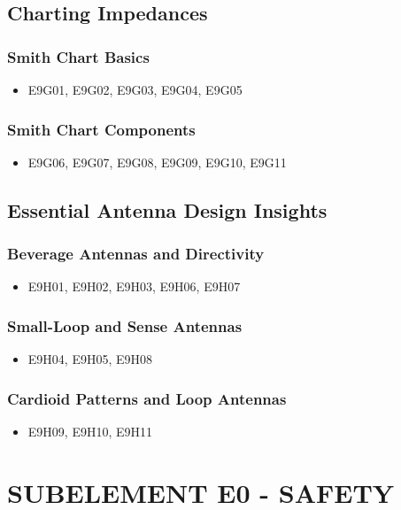 \documentclass{book}
\begin{document}
\section{Charting Impedances}
\subsection{Smith Chart Basics}
\begin{itemize}
    \item E9G01, E9G02, E9G03, E9G04, E9G05
\end{itemize}
\subsection{Smith Chart Components}
\begin{itemize}
    \item E9G06, E9G07, E9G08, E9G09, E9G10, E9G11
\end{itemize}

\section{Essential Antenna Design Insights}
\subsection{Beverage Antennas and Directivity}
\begin{itemize}
    \item E9H01, E9H02, E9H03, E9H06, E9H07
\end{itemize}
\subsection{Small-Loop and Sense Antennas}
\begin{itemize}
    \item E9H04, E9H05, E9H08
\end{itemize}
\subsection{Cardioid Patterns and Loop Antennas}
\begin{itemize}
    \item E9H09, E9H10, E9H11
\end{itemize}

\chapter{SUBELEMENT E0 - SAFETY}
\end{document}
